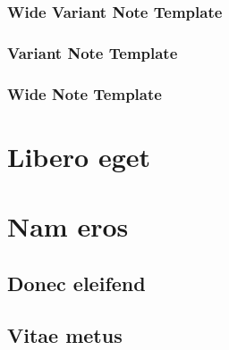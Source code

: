 \begin{hbNoteWide2}
\begin{multicols}{2}
\subsubsection*{Wide Variant Note Template}
\noindent\lipsum[11-13]
\end{multicols}
\end{hbNoteWide2}

\lipsum[4-12]


\begin{hbNote2}[b]
\subsubsection*{Variant Note Template}
\noindent\lipsum[106]
\end{hbNote2}

\begin{hbNoteWide}[b]
\begin{multicols}{2}
\subsubsection*{Wide Note Template}
\noindent\lipsum[13-14]
\end{multicols}
\end{hbNoteWide}

 \lipsum[110-111]

\lipsum[112-115]

\section*{Libero eget} \lipsum[116-118]
\section*{Nam eros} \lipsum[119-120]

\subsection*{Donec eleifend} \lipsum[120-121]
\subsection*{Vitae metus} \lipsum[124-125]

